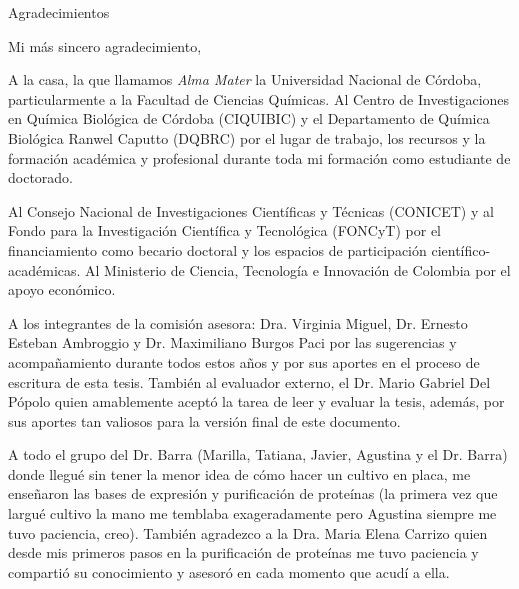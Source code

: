 \thispagestyle{empty}
{\LARGE \textcolor{myblue}{Agradecimientos}}\\

\begingroup
\setlength{\parindent}{0pt} %

Mi más sincero agradecimiento,\\\vspace{-0.6cm}

A la casa, la que llamamos  \textit{Alma Mater} la Universidad Nacional de Córdoba, particularmente a la Facultad de Ciencias Químicas. Al Centro de Investigaciones en Química Biológica de Córdoba (CIQUIBIC) y el Departamento de Química Biológica Ranwel Caputto (DQBRC) por el lugar de trabajo, los recursos y la formación académica y profesional durante toda mi formación como estudiante de doctorado.\\\vspace{-0.6cm}

Al Consejo Nacional de Investigaciones Científicas y Técnicas (CONICET) y al Fondo para la Investigación Científica y Tecnológica (FONCyT) por el financiamiento como becario doctoral y los espacios de participación científico-académicas. Al Ministerio de Ciencia, Tecnología e Innovación de Colombia por el apoyo económico.\\\vspace{-0.6cm}

A los integrantes de la comisión asesora: Dra. Virginia Miguel, Dr. Ernesto Esteban Ambroggio y Dr. Maximiliano Burgos Paci por las sugerencias y acompañamiento durante todos estos años y por sus aportes en el proceso de escritura de esta tesis. También al evaluador externo, el Dr. Mario Gabriel Del Pópolo quien amablemente aceptó la tarea de leer y evaluar la tesis, además, por sus aportes tan valiosos para la versión final de este documento.\\\vspace{-0.6cm}

A todo el grupo del Dr. Barra (Marilla, Tatiana, Javier, Agustina y el Dr. Barra) donde llegué sin tener la menor idea de cómo hacer un cultivo en placa, me enseñaron las bases de expresión y purificación de proteínas (la primera vez que largué cultivo la mano me temblaba exageradamente pero Agustina siempre me tuvo paciencia, creo). También agradezco a la Dra. Maria Elena Carrizo quien desde mis primeros pasos en la purificación de proteínas me tuvo paciencia y compartió su conocimiento y asesoró en cada momento que acudí a ella.\\\vspace{-0.6cm}

